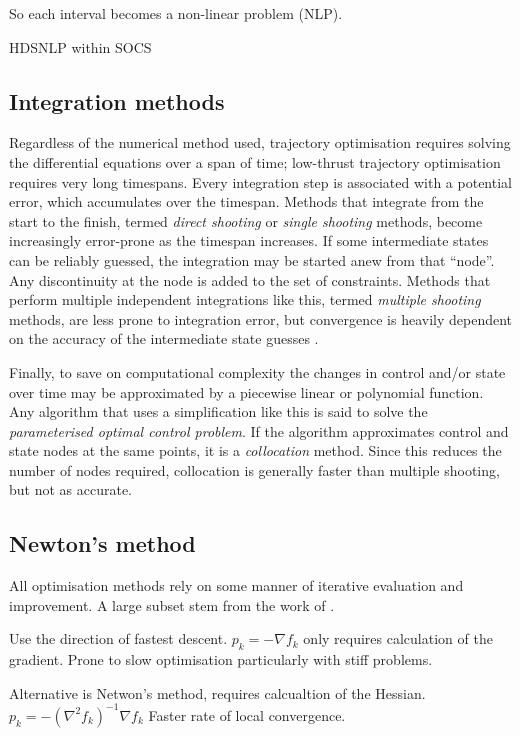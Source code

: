 So each interval becomes a non-linear problem (NLP).

HDSNLP within SOCS


\subsection{Integration methods}

Regardless of the numerical method used, trajectory optimisation requires solving the differential equations over a span of time; low-thrust trajectory optimisation requires very long timespans. Every integration step is associated with a potential error, which accumulates over the timespan. Methods that integrate from the start to the finish, termed \emph{direct shooting} or \emph{single shooting} methods, become increasingly error-prone as the timespan increases. If some intermediate states can be reliably guessed, the integration may be started anew from that \enquote{node}. Any discontinuity at the node is added to the set of constraints. Methods that perform multiple independent integrations like this, termed \emph{multiple shooting} methods, are less prone to integration error, but convergence is heavily dependent on the accuracy of the intermediate state guesses \parencite{Betts, ASTOS_guide}.

Finally, to save on computational complexity the changes in control and/or state over time may be approximated by a piecewise linear or polynomial function. Any algorithm that uses a simplification like this is said to solve the \emph{parameterised optimal control problem}. If the algorithm approximates control and state nodes at the same points, it is a \emph{collocation} method. Since this reduces the number of nodes required, collocation is generally faster than multiple shooting, but not as accurate.%

\subsection{Newton's method}

All optimisation methods rely on some manner of iterative evaluation and improvement. A large subset stem from the work of \cite{Newton1711}. 

Use the direction of fastest descent. $p_k=-\nabla f_k$ only requires calculation of the gradient. Prone to slow optimisation particularly with stiff problems.

Alternative is Netwon's method, requires calcualtion of the Hessian. $p_k=-(\nabla^2f_k)^{-1}\nabla f_k$
Faster rate of local convergence.


